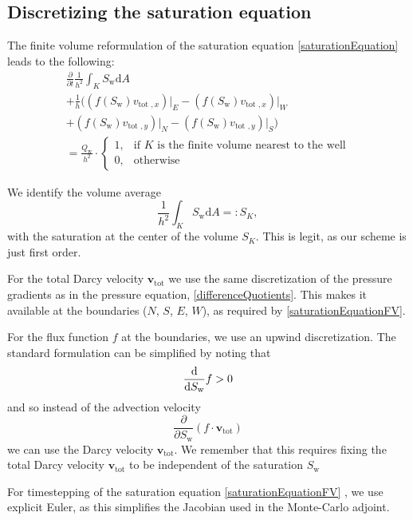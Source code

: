 \documentclass[conference]{IEEEtran}
\renewcommand*{\d}[1]{\ensuremath{\mathrm{d}#1}}
\newcommand*{\diff}[2]{\ensuremath{\frac{\d}{\d{#2}}{#1}}}
\newcommand*{\pdiff}[2]{\ensuremath{\frac{\partial}{\partial{#2}}{#1}}}
\renewcommand*{\vec}[1]{\ensuremath{{\bm{#1}}}}
\begin{document}
\subsection{Discretizing the saturation equation}
\label{discSaturationEquation}
The finite volume reformulation of the saturation equation \eqref{saturationEquation} leads to the following:
\begin{multline}
\label{saturationEquationFV}
\pdiff{\frac{1}{h^2} \int_K S_\text{w} \d{A}}{t} \\+ \frac{1}{h}\biggr((f(S_\text{w})v_{\text{tot }, x})\lvert_E - (f(S_\text{w})v_{\text{tot }, x})\lvert_W \\+ (f(S_\text{w})v_{\text{tot }, y})\lvert_N - (f(S_\text{w})v_{\text{tot }, y})\lvert_S\biggr) \\=
\frac{Q_\text{w}}{h^2} \cdot \begin{cases} 1, &\text{if } K \text{ is the finite volume nearest to the well} \\0, &\text{otherwise}\end{cases}
\end{multline}

We identify the volume average
\begin{equation}
\frac{1}{h^2} \int_K S_\text{w} \d{A} =: S_K,
\end{equation}
with the saturation at the center of the volume $S_K$. This is legit, as our scheme is just first order.

For the total Darcy velocity $\vec{v}_\text{tot}$ we use the same discretization of the pressure gradients as in the pressure equation, \eqref{differenceQuotients}.
This makes it available at the boundaries ($N$, $S$, $E$, $W$), as required by \eqref{saturationEquationFV}.

For the flux function $f$ at the boundaries, we use an upwind discretization. The standard formulation can be simplified by noting that \begin{equation}
\diff{f}{S_\text{w}} > 0
\end{equation}
and so instead of the advection velocity
\begin{equation}
\pdiff{(f \cdot \vec{v}_\text{tot})}{S_\text{w}}
\end{equation}
we can use the Darcy velocity $\vec{v}_\text{tot}.$
We remember that this requires fixing the total Darcy velocity $\vec{v}_\text{tot}$ to be independent of the saturation $S_\text{w}$

For timestepping of the saturation equation \eqref{saturationEquationFV} , we use explicit Euler, as this simplifies the Jacobian used in the Monte-Carlo adjoint.
\end{document}
